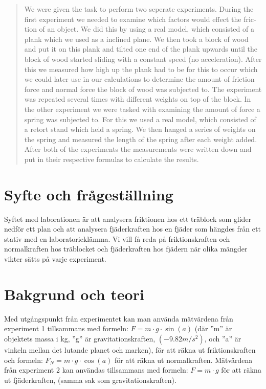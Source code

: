 \documentclass[11p, titlepage, oneside, a4paper]{article}
\begin{document}
    \begin{otherlanguage}{english}
	\begin{abstract}
        We were given the task to perform two seperate experiments. During the first experiment we needed to examine which factors would effect the friction of an object. We did this by using a real model, which consisted of a plank which we used as a inclined plane. We then took a block of wood and put it on this plank and tilted one end of the plank upwards until the block of wood started sliding with a constant speed (no acceleration). After this we measured how high up the plank had to be for this to occur which we could later use in our calculations to determine the amount of friction force and normal force the block of wood was subjected to. The experiment was repeated several times with different weights on top of the block. In the other experiment we were tasked with examining the amount of force a spring was subjected to. For this we used a real model, which consisted of a retort stand which held a spring. We then hanged a series of weights on the spring and measured the length of the spring after each weight added. After both of the experiments the measurements were written down and put in their respective formulas to calculate the results.
    \end{abstract}
    \end{otherlanguage}
	\tableofcontents
	
	\newpage

	
	\setlength{\parindent}{0pt}
	\setlength{\parskip}{10pt}
	
	\section{Syfte och frågeställning}
		Syftet med laborationen är att analysera friktionen hos ett träblock som glider nedför ett plan och att analysera fjäderkraften hos en fjäder som hängdes från ett stativ med en laboratorieklämma. Vi vill få reda på friktionskraften och normalkraften hos träblocket och fjäderkraften hos fjädern när olika mängder vikter sätts på varje experiment.

	\section{Bakgrund och teori}
        Med utgångspunkt från experimentet kan man använda mätvärdena från experiment 1 tillsammans med formeln: $F = {m}\cdot{g}\cdot{\sin(a)}$ (där ''m'' är objektets massa i kg, ''g'' är gravitationskraften, $(-9.82m/s^{2})$, och ''a'' är vinkeln mellan det lutande planet och marken), för att räkna ut friktionskraften och formeln: $F_N = {m}\cdot{g}\cdot{\cos(a)}$ för att räkna ut normalkraften. Mätvärdena från experiment 2 kan användas tillsammans med formeln: $F = {m}\cdot{g}$ för att räkna ut fjäderkraften, (samma sak som gravitationskraften).
	
\end{document}

